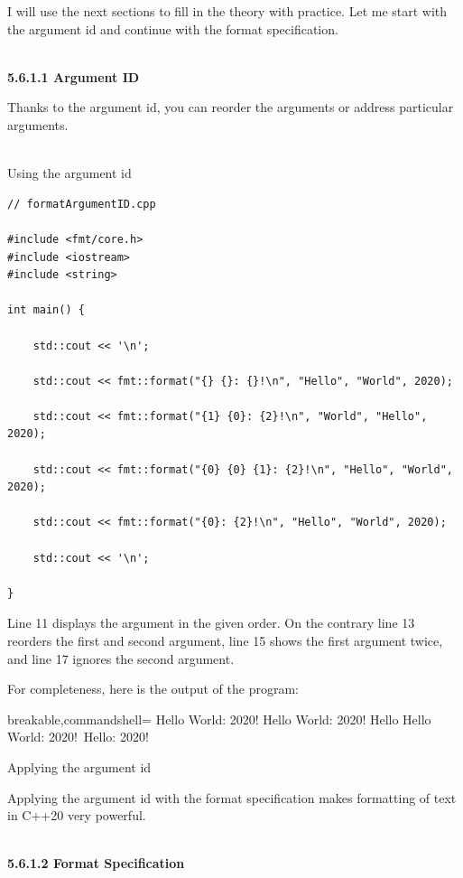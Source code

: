I will use the next sections to fill in the theory with practice. Let me start with the argument id and continue with the format specification.

\hspace*{\fill} \\ %
\noindent
\textbf{5.6.1.1\hspace{0.2cm} Argument ID}

Thanks to the argument id, you can reorder the arguments or address particular arguments.

\hspace*{\fill} \\ %
\noindent
Using the argument id
\begin{lstlisting}[style=styleCXX]
// formatArgumentID.cpp

#include <fmt/core.h>
#include <iostream>
#include <string>

int main() {
	
	std::cout << '\n';
	
	std::cout << fmt::format("{} {}: {}!\n", "Hello", "World", 2020);
	
	std::cout << fmt::format("{1} {0}: {2}!\n", "World", "Hello", 2020);
	
	std::cout << fmt::format("{0} {0} {1}: {2}!\n", "Hello", "World", 2020);
	
	std::cout << fmt::format("{0}: {2}!\n", "Hello", "World", 2020);
	
	std::cout << '\n';

}
\end{lstlisting}

Line 11 displays the argument in the given order. On the contrary line 13 reorders the first and second argument, line 15 shows the first argument twice, and line 17 ignores the second argument.

For completeness, here is the output of the program:

\begin{tcblisting}{breakable,commandshell={}}
Hello World: 2020!
Hello World: 2020!
Hello Hello World: 2020!\
Hello: 2020!
\end{tcblisting}

\begin{center}
Applying the argument id
\end{center}

Applying the argument id with the format specification makes formatting of text in C++20 very powerful.

\hspace*{\fill} \\ %
\noindent
\textbf{5.6.1.2\hspace{0.2cm} Format Specification}

